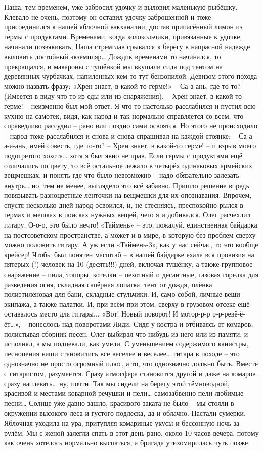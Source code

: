 Паша, тем временем, уже забросил удочку и выловил маленькую рыбёшку. Клевало не очень, поэтому он оставил удочку заброшенной и тоже присоединился к нашей яблочной вакханалии, достав припасённый лимон из гермы с продуктами. Временами, когда колокольчики, привязанные к удочке, начинали позвякивать, Паша стремглав срывался к берегу в напрасной надежде выловить достойный экземпляр… Дождик временами то начинался, то прекращался, и макароны с тушёнкой мы вкушали сидя под тентом на деревянных чурбачках, напиленных кем-то тут бензопилой. 
Девизом этого похода можно назвать фразу: «Хрен знает, в какой-то герме!»
– Са-а-ань, где то-то? (Имеется в виду что-то из еды или из снаряжения). 
– Хрен знает, в какой-то герме! – неизменно был мой ответ. 
Я что-то настолько расслабился и пустил всю кухню на самотёк, видя, как народ и так нормально справляется со всем, что справедливо рассудил – рано или поздно сами освоятся. Но этого не происходило – народ тоже расслабился и снова и снова спрашивал на каждой стоянке: 
– Са-а-а-а-ань, имей совесть, где то-то? 
– Хрен знает, в какой-то герме! – и взрыв моего подогретого хохота… хотя я был явно не прав. Если гермы с продуктами ещё отличались по цвету, то всё остальное лежало в четырёх одинаковых армейских вещмешках, и понять где что было невозможно – надо обязательно залезать внутрь… но, тем не менее, выглядело это всё забавно. Пришло решение впредь повязывать разноцветные ленточки на вещмешки для их опознавания. Впрочем, спустя несколько дней народ освоился, и, не стесняясь, преспокойно рылся в гермах и мешках в поисках нужных вещей, чего я и добивался.
Олег расчехлил гитару. О-о-о, это было нечто! «Таймень» – это, пожалуй, единственная байдарка на постсоветском пространстве, а может и в мире, в которую без проблем сверху можно положить гитару. А уж если «Таймень-3», как у нас сейчас, то это вообще крейсер! Чтобы был понятен масштаб – в нашей байдарке ехала вся провизия на пятерых (!) человек на 10 (десять!!!) дней, включая тушёнку, а также групповое снаряжение – пила, топоры, котелки – пехотный и десантные, газовая горелка для разведения огня, складная сапёрная лопатка, тент от дождя, плёнка полиэтиленовая для бани, складные стульчики. И, само собой, личные вещи экипажа, а также палатки. И, при всём при этом, сверху в грузовом отсеке ещё оставалось место для гитары...
«Вот! Новый поворот! И мотор-р-р  р-р-ревё-ё-ёт…», – понеслось над поворотами Лиди. Сидя у костра и отбиваясь от комаров, полистывая сборник песен, Олег выбирал что-нибудь из него или из памяти, и исполнял, а мы подпевали, как умели. С уменьшением содержимого канистры, песнопения наши становились все веселее и веселее… гитара в походе – это однозначно не просто огромный плюс, а то, что однозначно должно быть. Вместе с гитаристом, разумеется. Сразу атмосфера становится другой и даже на комаров сразу наплевать… ну, почти. Так мы сидели на берегу этой тёмноводной, красивой и местами коварной речушки и пели… самозабвенно пели любимые песни…
Солнце уже давно зашло, красивого заката не было – мы стояли в окружении высокого леса и густого подлеска, да и облачно. Настали сумерки. Яблочная уходила на ура, притупляя комариные укусы и бессонную ночь за рулём. Мы с женой залегли спать в этот день рано, около 10 часов вечера, потому как очень хотелось нормально выспаться, а бригада утихомирилась чуть позже.

\begin{center}
\end{center}
